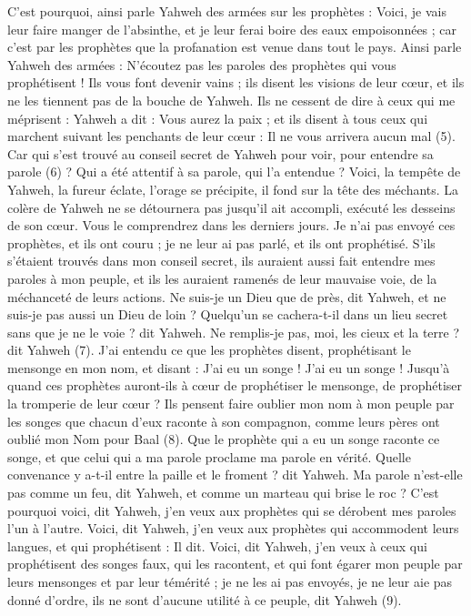 \begin{multicols}{2}
C'est pourquoi, ainsi parle Yahweh des armées sur les prophètes : Voici, je vais leur faire manger de l'absinthe, et je leur ferai boire des eaux empoisonnées ; car c’est par les prophètes que la profanation est venue dans tout le pays.
Ainsi parle Yahweh des armées : N'écoutez pas les paroles des prophètes qui vous prophétisent ! Ils vous font devenir vains ; ils disent les visions de leur cœur, et ils ne les tiennent pas de la bouche de Yahweh.
Ils ne cessent de dire à ceux qui me méprisent : Yahweh a dit : Vous aurez la paix ; et ils disent à tous ceux qui marchent suivant les penchants de leur cœur : Il ne vous arrivera aucun mal\FTNT{} (5).
Car qui s'est trouvé au conseil secret de Yahweh pour voir, pour entendre sa parole\FTNT{} (6) ? Qui a été attentif à sa parole, qui l'a entendue ?
Voici, la tempête de Yahweh, la fureur éclate, l’orage se précipite, il fond sur la tête des méchants.
La colère de Yahweh ne se détournera pas jusqu’il ait accompli, exécuté les desseins de son cœur. Vous le comprendrez dans les derniers jours.
Je n'ai pas envoyé ces prophètes, et ils ont couru ; je ne leur ai pas parlé, et ils ont prophétisé.
S'ils s'étaient trouvés dans mon conseil secret, ils auraient aussi fait entendre mes paroles à mon peuple, et ils les auraient ramenés de leur mauvaise voie, de la méchanceté de leurs actions.
Ne suis-je un Dieu que de près, dit Yahweh, et ne suis-je pas aussi un Dieu de loin ?
Quelqu'un se cachera-t-il dans un lieu secret sans que je ne le voie ? dit Yahweh. Ne remplis-je pas, moi, les cieux et la terre ? dit Yahweh\FTNT{} (7).
J'ai entendu ce que les prophètes disent, prophétisant le mensonge en mon nom, et disant : J'ai eu un songe ! J’ai eu un songe !
Jusqu’à quand ces prophètes auront-ils à cœur de prophétiser le mensonge, de prophétiser la tromperie de leur cœur ?
Ils pensent faire oublier mon nom à mon peuple par les songes que chacun d'eux raconte à son compagnon, comme leurs pères ont oublié mon Nom pour Baal\FTNT{} (8).
Que le prophète qui a eu un songe raconte ce songe, et que celui qui a ma parole proclame ma parole en vérité. Quelle convenance y a-t-il entre la paille et le froment ? dit Yahweh.
Ma parole n'est-elle pas comme un feu, dit Yahweh, et comme un marteau qui brise le roc ?
C'est pourquoi voici, dit Yahweh, j'en veux aux prophètes qui se dérobent mes paroles l’un à l’autre.
Voici, dit Yahweh, j'en veux aux prophètes qui accommodent leurs langues, et qui prophétisent : Il dit.
Voici, dit Yahweh, j'en veux à ceux qui prophétisent des songes faux, qui les racontent, et qui font égarer mon peuple par leurs mensonges et par leur témérité ; je ne les ai pas envoyés, je ne leur aie pas donné d’ordre, ils ne sont d’aucune utilité à ce peuple, dit Yahweh\FTNT{} (9).

\end{multicols}
